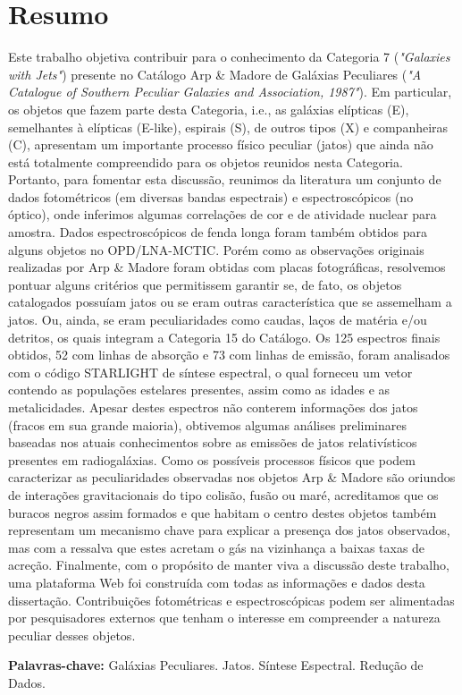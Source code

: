 \chapter*{Resumo}

 Este trabalho objetiva contribuir para o conhecimento da Categoria 7 (\textit{"Galaxies with Jets"}) presente no Catálogo Arp \& Madore de Galáxias Peculiares (\textit{"A Catalogue of Southern Peculiar Galaxies and Association, 1987"}). Em particular, os objetos que fazem parte desta Categoria, i.e., as galáxias elípticas (E), semelhantes à elípticas (E-like), espirais (S), de outros tipos (X) e companheiras (C), apresentam um importante processo físico peculiar (jatos) que ainda não está totalmente compreendido para os objetos reunidos nesta Categoria. Portanto, para fomentar esta discussão, reunimos da literatura um conjunto de dados fotométricos (em diversas bandas espectrais) e espectroscópicos (no óptico), onde inferimos algumas correlações de cor e de atividade nuclear para amostra. Dados espectroscópicos de fenda longa foram também obtidos para alguns objetos no OPD/LNA-MCTIC. Porém como as observações originais realizadas por Arp \& Madore foram obtidas com placas fotográficas,  resolvemos pontuar alguns critérios que permitissem garantir se, de fato, os objetos catalogados possuíam jatos ou se eram outras característica que se assemelham a jatos. Ou, ainda, se eram peculiaridades como caudas, laços de matéria e/ou detritos, os quais integram a Categoria 15 do Catálogo. Os 125 espectros finais obtidos, 52 com linhas de absorção e 73 com linhas de emissão, foram analisados com o código STARLIGHT de síntese espectral, o qual forneceu um vetor contendo as populações estelares presentes, assim como as idades e as metalicidades. Apesar destes espectros não conterem informações dos jatos (fracos em sua grande maioria), obtivemos algumas análises preliminares baseadas nos atuais conhecimentos sobre as emissões de jatos relativísticos presentes em radiogaláxias. Como os possíveis processos físicos que podem caracterizar as peculiaridades observadas nos objetos Arp \& Madore são oriundos de interações gravitacionais do tipo colisão, fusão ou maré, acreditamos que os buracos negros assim formados e que habitam o centro destes objetos também representam um mecanismo chave para explicar a presença dos jatos observados, mas com a ressalva que estes acretam o gás na vizinhança a baixas taxas de acreção. Finalmente, com o propósito de manter viva a discussão deste trabalho, uma plataforma Web foi construída com todas as informações e dados desta dissertação. Contribuições fotométricas e espectroscópicas podem ser alimentadas por pesquisadores externos que tenham o interesse em compreender a natureza peculiar desses objetos.

\vspace{.5cm}

\textbf{Palavras-chave:} Galáxias Peculiares. Jatos. Síntese Espectral. Redução de Dados.

